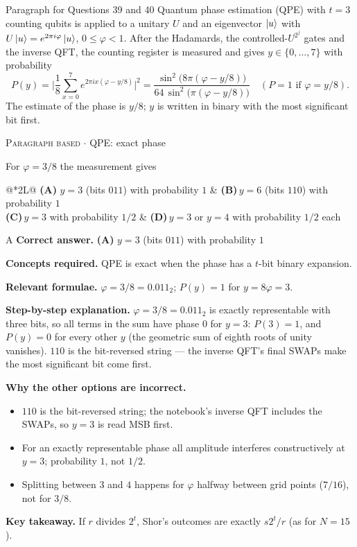 \documentclass[11pt,a4paper]{article}
\newcommand{\optlabel}[1]{\textbf{(#1)}}
\newcommand{\correctlabel}[1]{\textcolor{okgreen}{\textbf{(#1)}\,\ding{51}}}
\newenvironment{qitem}[1]{\begin{list}{}{\setlength{\leftmargin}{3.3em}\setlength{\labelwidth}{3.1em}%
  \setlength{\labelsep}{0.2em}\setlength{\topsep}{3pt}\setlength{\parsep}{3pt}}\item[\textbf{Q.#1}\hfill]}{\end{list}}
\newcommand{\qsep}{\par\vspace{2pt}{\color{black!15}\hrule}\vspace{4pt}}
\newcommand{\qmeta}[2]{{\footnotesize\color{black!60}\textsc{#1} \;$\cdot$\; #2}\par}
\begin{document}
\begin{passagebox}{Paragraph for Questions 39 and 40}
Quantum phase estimation (QPE) with $t = 3$ counting qubits is applied to a unitary $U$ and an eigenvector $\ket u$ with
$U\ket u = e^{2\pi i\varphi}\ket u$, $0 \le \varphi < 1$. After the Hadamards, the controlled-$U^{2^j}$ gates and the inverse QFT, the counting register is
measured and gives $y \in \{0, \dots, 7\}$ with probability
\[ P(y) = \Big|\frac18\sum_{x=0}^{7}e^{2\pi ix(\varphi - y/8)}\Big|^2 = \frac{\sin^2\big(8\pi(\varphi - y/8)\big)}{64\,\sin^2\big(\pi(\varphi - y/8)\big)}\quad(P = 1\text{ if }\varphi = y/8). \]
The estimate of the phase is $y/8$; $y$ is written in binary with the most significant bit first.
\end{passagebox}
\begin{qitem}{39}
\qmeta{Paragraph based}{QPE: exact phase}
For $\varphi = 3/8$ the measurement gives
\par\smallskip\noindent\begin{tabularx}{\linewidth}{@{}*{2}{L}@{}}
\correctlabel{A}\,$y = 3$ (bits $011$) with probability $1$ & \optlabel{B}\,$y = 6$ (bits $110$) with probability $1$ \\[3pt]
\optlabel{C}\,$y = 3$ with probability $1/2$ & \optlabel{D}\,$y = 3$ or $y = 4$ with probability $1/2$ each
\end{tabularx}
\end{qitem}
\begin{solbox}{A}
\textbf{\color{brand}Correct answer.} \textcolor{okgreen}{\textbf{(A)}} $y = 3$ (bits $011$) with probability $1$

\textbf{\color{brand}Concepts required.} QPE is exact when the phase has a $t$-bit binary expansion.

\textbf{\color{brand}Relevant formulae.} $\varphi = 3/8 = 0.011_2$; $P(y) = 1$ for $y = 8\varphi = 3$.

\textbf{\color{brand}Step-by-step explanation.} $\varphi = 3/8 = 0.011_2$ is exactly representable with three bits, so all terms in the sum have phase $0$ for $y = 3$: $P(3) = 1$, and $P(y) = 0$ for every
other $y$ (the geometric sum of eighth roots of unity vanishes). $110$ is the bit-reversed string --- the inverse QFT's final SWAPs make the most significant
bit come first.

\textbf{\color{brand}Why the other options are incorrect.}
\begin{itemize}[leftmargin=2.4em, itemsep=1pt, topsep=2pt]
\item[\textbf{(B)}] $110$ is the bit-reversed string; the notebook's inverse QFT includes the SWAPs, so $y = 3$ is read MSB first.
\item[\textbf{(C)}] For an exactly representable phase all amplitude interferes constructively at $y = 3$; probability $1$, not $1/2$.
\item[\textbf{(D)}] Splitting between $3$ and $4$ happens for $\varphi$ halfway between grid points ($7/16$), not for $3/8$.
\end{itemize}
\textbf{\color{brand}Key takeaway.} If $r$ divides $2^t$, Shor's outcomes are exactly $s2^t/r$ (as for $N = 15$).
\end{solbox}
\qsep
\end{document}
